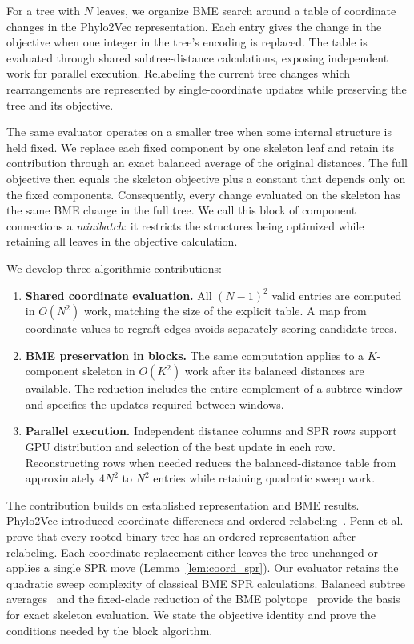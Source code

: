 \documentclass[11pt,a4paper]{article}
\makeatletter
\DeclareRobustCommand{\_}{\ifmmode\nfss@text{\textunderscore}\else\textunderscore\allowbreak\fi}
\theoremstyle{definition}
\makeatother
\begin{document}
For a tree with $N$ leaves, we organize BME search around a table of coordinate changes in the Phylo2Vec representation.
Each entry gives the change in the objective when one integer in the tree's encoding is replaced.
The table is evaluated through shared subtree-distance calculations, exposing independent work for parallel execution.
Relabeling the current tree changes which rearrangements are represented by single-coordinate updates while preserving the tree and its objective.

The same evaluator operates on a smaller tree when some internal structure is held fixed.
We replace each fixed component by one skeleton leaf and retain its contribution through an exact balanced average of the original distances.
The full objective then equals the skeleton objective plus a constant that depends only on the fixed components.
Consequently, every change evaluated on the skeleton has the same BME change in the full tree.
We call this block of component connections a \emph{minibatch}: it restricts the structures being optimized while retaining all leaves in the objective calculation.

\begin{samepage}
We develop three algorithmic contributions:
\begin{enumerate}
 \item \textbf{Shared coordinate evaluation.} All $(N-1)^2$ valid entries are computed in $O(N^2)$ work, matching the size of the explicit table. A map from coordinate values to regraft edges avoids separately scoring candidate trees.
 \item \textbf{BME preservation in blocks.} The same computation applies to a $K$-component skeleton in $O(K^2)$ work after its balanced distances are available. The reduction includes the entire complement of a subtree window and specifies the updates required between windows.
 \item \textbf{Parallel execution.} Independent distance columns and SPR rows support GPU distribution and selection of the best update in each row. Reconstructing rows when needed reduces the balanced-distance table from approximately $4N^2$ to $N^2$ entries while retaining quadratic sweep work.
\end{enumerate}
\end{samepage}

The contribution builds on established representation and BME results.
Phylo2Vec introduced coordinate differences and ordered relabeling~\cite[Section~1.3.2]{penn2024phylo2vec}.
Penn et al.~\cite[Lemmas~0.9--0.11]{penn2023gradme} prove that every rooted binary tree has an ordered representation after relabeling.
Each coordinate replacement either leaves the tree unchanged or applies a single SPR move (Lemma~\ref{lem:coord_spr}).
Our evaluator retains the quadratic sweep complexity of classical BME SPR calculations.
Balanced subtree averages~\cite{desper2002fast,desper2004theory} and the fixed-clade reduction of the BME polytope~\cite[Section~2.4]{haws2011optimality} provide the basis for exact skeleton evaluation.
We state the objective identity and prove the conditions needed by the block algorithm.
\end{document}
